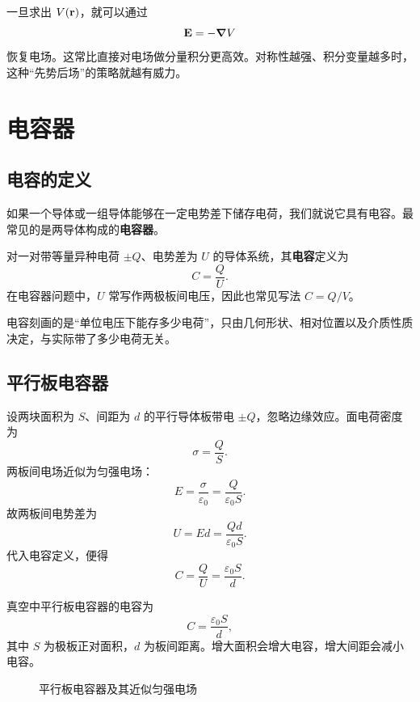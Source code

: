 一旦求出 $V(\vb r)$，就可以通过
\[
\vb E=-\grad V
\]
恢复电场。这常比直接对电场做分量积分更高效。对称性越强、积分变量越多时，这种“先势后场”的策略就越有威力。

\section{电容器}

\subsection{电容的定义}

如果一个导体或一组导体能够在一定电势差下储存电荷，我们就说它具有电容。最常见的是两导体构成的\textbf{电容器}。

\begin{definition}
对一对带等量异种电荷 $\pm Q$、电势差为 $U$ 的导体系统，其\textbf{电容}定义为
\[
C=\frac{Q}{U}.
\]
在电容器问题中，$U$ 常写作两极板间电压，因此也常见写法 $C=Q/V$。
\end{definition}

电容刻画的是“单位电压下能存多少电荷”，只由几何形状、相对位置以及介质性质决定，与实际带了多少电荷无关。

\subsection{平行板电容器}

设两块面积为 $S$、间距为 $d$ 的平行导体板带电 $\pm Q$，忽略边缘效应。面电荷密度为
\[
\sigma=\frac{Q}{S}.
\]
两板间电场近似为匀强电场：
\[
E=\frac{\sigma}{\varepsilon_0}=\frac{Q}{\varepsilon_0 S}.
\]
故两板间电势差为
\[
U=Ed=\frac{Qd}{\varepsilon_0 S}.
\]
代入电容定义，便得
\[
C=\frac{Q}{U}=\frac{\varepsilon_0 S}{d}.
\]

\begin{law}
真空中平行板电容器的电容为
\[
C=\frac{\varepsilon_0 S}{d},
\]
其中 $S$ 为极板正对面积，$d$ 为板间距离。增大面积会增大电容，增大间距会减小电容。
\end{law}

\begin{figure}[H]
\centering
{}
\caption{平行板电容器及其近似匀强电场}
\end{figure}

